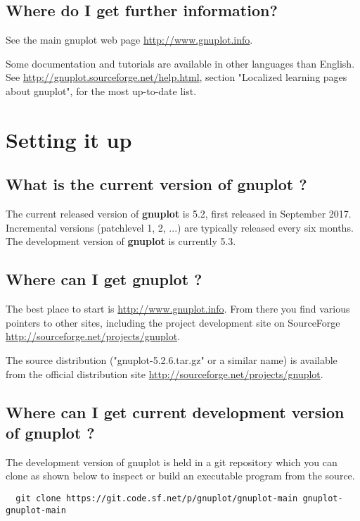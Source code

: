 \documentclass[a4paper,11pt]{article}
\def\http#1{{\small\href{http://#1}{\url{http://#1}}}}
\newcommand{\http}[1]%
            {\htmladdnormallink{\latex{\url{http://#1}}%
                    \html{\textit{http://#1}}}%
                {http://#1}%
            }
\newcommand{\gnuplot}{\textbf{gnuplot }}
\begin{document}
\subsection{Where do I get further information?}

See the main gnuplot web page \http{www.gnuplot.info}.

Some documentation and tutorials are available in other languages than English.
See \http{gnuplot.sourceforge.net/help.html}, section "Localized learning pages
about gnuplot", for the most up-to-date list.


\section{Setting it up}

\subsection{What is the current version of \gnuplot?}

The current released version of \gnuplot is 5.2, first released in September 2017.
Incremental versions (patchlevel 1, 2, ...) are typically released every six months.
The development version of \gnuplot is currently 5.3.

\subsection{Where can I get \gnuplot?}
\label{where-get-gnuplot}

The best place to start is \http{www.gnuplot.info}. From there
you find various pointers to other sites, including the project
development site on SourceForge \http{sourceforge.net/projects/gnuplot}.

The source distribution ("gnuplot-5.2.6.tar.gz" or a similar name) is
available from the official distribution site \http{sourceforge.net/projects/gnuplot}.

\subsection{Where can I get current development version of \gnuplot?}

The development version of gnuplot is held in a git repository which you
can clone as shown below to inspect or build an executable program 
from the source.

\scriptsize
\begin{verbatim}
  git clone https://git.code.sf.net/p/gnuplot/gnuplot-main gnuplot-gnuplot-main
\end{verbatim}
\normalsize
\end{document}
